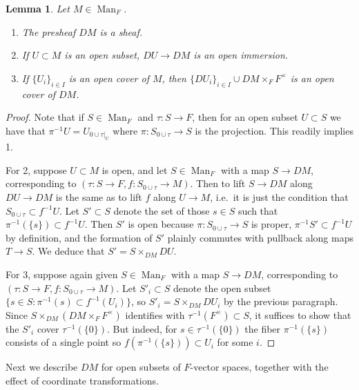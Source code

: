 \documentclass[12pt]{article}
\newtheorem{lemma}[theorem]{Lemma}
\begin{document}
\begin{lemma}\label{coverdef}
Let $M\in\operatorname{Man}_F$.
\begin{enumerate}
\item The presheaf $DM$ is a sheaf.
\item If $U\subset M$ is an open subset, $DU\rightarrow DM$ is an open immersion.

\item If $\{U_i\}_{i\in I}$ is an open cover of $M$, then $\{DU_i\}_{i\in I}\cup DM\times_F F^\times$ is an open cover of $DM$.
\end{enumerate}
\end{lemma}
\begin{proof}
Note that if $S\in\operatorname{Man}_F$ and $\tau:S\rightarrow F$, then for an open subset $U\subset S$ we have that $\pi^{-1}U = U_{0\cup \tau|_U}$ where $\pi:S_{0\cup \tau}\rightarrow S$ is the projection.  This readily implies 1.

For 2, suppose $U\subset M$ is open, and let $S\in\operatorname{Man}_F$ with a map $S\rightarrow DM$, corresponding to $(\tau:S\rightarrow F,f:S_{0\cup \tau}\rightarrow M)$.  Then to lift $S\rightarrow DM$ along $DU\rightarrow DM$ is the same as to lift $f$ along $U\rightarrow M$, i.e.\ it is just the condition that $S_{0\cup \tau}\subset f^{-1}U$.  Let $S'\subset S$ denote the set of those $s\in S$ such that $\pi^{-1}(\{s\})\subset f^{-1}U$.  Then $S'$ is open because $\pi:S_{0\cup \tau}\rightarrow S$ is proper, $\pi^{-1}S'\subset f^{-1}U$ by definition, and the formation of $S'$ plainly commutes with pullback along maps $T\rightarrow S$. We deduce that $S'=S\times_{DM}{DU}$.

For 3, suppose again given $S\in\operatorname{Man}_F$ with a map $S\rightarrow DM$, corresponding to $(\tau:S\rightarrow F,f:S_{0\cup \tau}\rightarrow M)$.  Let $S'_i\subset S$ denote the open subset $\{s\in S: \pi^{-1}(s)\subset f^{-1}(U_i)\}$, so $S'_i=S\times_{DM}{DU_i}$ by the previous paragraph.  Since $S\times_{DM}(DM\times_F F^\times)$ identifies with $\tau^{-1}(F^\times)\subset S$, it suffices to show that the $S'_i$ cover $\tau^{-1}(\{0\})$.  But indeed, for $s\in \tau^{-1}(\{0\})$ the fiber $\pi^{-1}(\{s\})$ consists of a single point so $f(\pi^{-1}(\{s\}))\subset U_i$ for some $i$.
\end{proof}

Next we describe $DM$ for open subsets of $F$-vector spaces, together with the effect of coordinate transformations.
\end{document}
